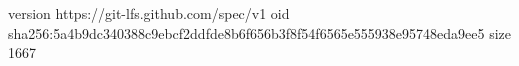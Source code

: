 version https://git-lfs.github.com/spec/v1
oid sha256:5a4b9dc340388c9ebcf2ddfde8b6f656b3f8f54f6565e555938e95748eda9ee5
size 1667
